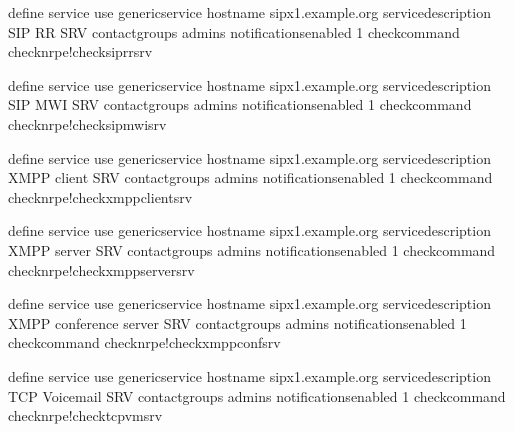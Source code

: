 \documentclass[letterpaper,10pt,english]{sphinxmanual}
\begin{document}
\begin{sphinxVerbatim}[commandchars=\\\{\}]
define service\PYGZob{}
        use                             generic\PYGZhy{}service
        host\PYGZus{}name                       sipx1.example.org
        service\PYGZus{}description             SIP RR SRV
        contact\PYGZus{}groups                  admins
        notifications\PYGZus{}enabled           1
        check\PYGZus{}command                   check\PYGZus{}nrpe!check\PYGZus{}sip\PYGZus{}rr\PYGZus{}srv
        \PYGZcb{}

define service\PYGZob{}
        use                             generic\PYGZhy{}service
        host\PYGZus{}name                       sipx1.example.org
        service\PYGZus{}description             SIP MWI SRV
        contact\PYGZus{}groups                  admins
        notifications\PYGZus{}enabled           1
        check\PYGZus{}command                   check\PYGZus{}nrpe!check\PYGZus{}sip\PYGZus{}mwi\PYGZus{}srv
        \PYGZcb{}

define service\PYGZob{}
        use                             generic\PYGZhy{}service
        host\PYGZus{}name                       sipx1.example.org
        service\PYGZus{}description             XMPP client SRV
        contact\PYGZus{}groups                  admins
        notifications\PYGZus{}enabled           1
        check\PYGZus{}command                   check\PYGZus{}nrpe!check\PYGZus{}xmpp\PYGZus{}client\PYGZus{}srv
        \PYGZcb{}

define service\PYGZob{}
        use                             generic\PYGZhy{}service
        host\PYGZus{}name                       sipx1.example.org
        service\PYGZus{}description             XMPP server SRV
        contact\PYGZus{}groups                  admins
        notifications\PYGZus{}enabled           1
        check\PYGZus{}command                   check\PYGZus{}nrpe!check\PYGZus{}xmpp\PYGZus{}server\PYGZus{}srv
        \PYGZcb{}

define service\PYGZob{}
        use                             generic\PYGZhy{}service
        host\PYGZus{}name                       sipx1.example.org
        service\PYGZus{}description             XMPP conference server SRV
        contact\PYGZus{}groups                  admins
        notifications\PYGZus{}enabled           1
        check\PYGZus{}command                   check\PYGZus{}nrpe!check\PYGZus{}xmpp\PYGZus{}conf\PYGZus{}srv
        \PYGZcb{}

define service\PYGZob{}
        use                             generic\PYGZhy{}service
        host\PYGZus{}name                       sipx1.example.org
        service\PYGZus{}description             TCP Voicemail SRV
        contact\PYGZus{}groups                  admins
        notifications\PYGZus{}enabled           1
        check\PYGZus{}command                   check\PYGZus{}nrpe!check\PYGZus{}tcp\PYGZus{}vm\PYGZus{}srv
        \PYGZcb{}


\end{sphinxVerbatim}
\end{document}
